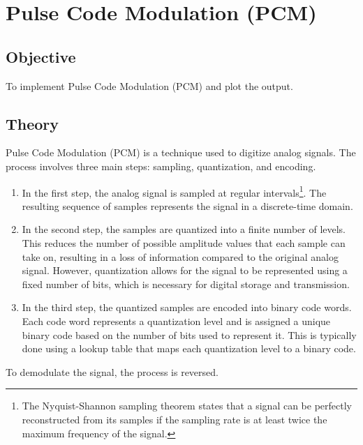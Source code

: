 \pagebreak

\section{Pulse Code Modulation (PCM)}
\label{sec:Pulse Code Modulation (PCM)}

\subsection{Objective}
To implement Pulse Code Modulation (PCM) and plot the output.

\subsection{Theory}

Pulse Code Modulation (PCM) is a technique used to digitize analog signals.
The process involves three main steps: sampling, quantization, and encoding.


\begin{enumerate}
      \item In the first step, the analog signal is sampled at regular intervals\footnote[1]{The Nyquist-Shannon sampling theorem states that a signal can be perfectly reconstructed from its samples if the sampling rate is at least twice the maximum frequency of the signal.}.
            The resulting sequence of samples represents the signal in a discrete-time domain.

      \item In the second step, the samples are quantized into a finite number of levels.
            This reduces the number of possible amplitude values that each sample can take on, resulting in a loss of information compared to the original analog signal.
            However, quantization allows for the signal to be represented using a fixed number of bits, which is necessary for digital storage and transmission.

      \item In the third step, the quantized samples are encoded into binary code words.
            Each code word represents a quantization level and is assigned a unique binary code based on the number of bits used to represent it.
            This is typically done using a lookup table that maps each quantization level to a binary code.
\end{enumerate}

To demodulate the signal, the process is reversed.

